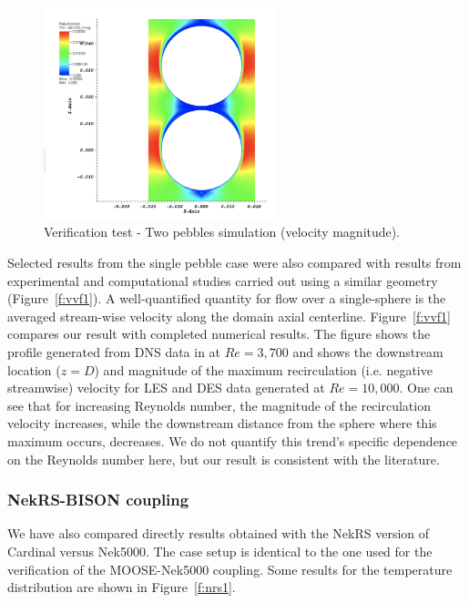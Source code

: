 \begin{figure}[!h]
\centering
\includegraphics[clip=true,width=0.6\textwidth]{Figures/pb_vv2}
\caption{Verification test - Two pebbles simulation (velocity magnitude).}
\label{f:vvf2}
\end{figure}

Selected results from the single pebble case were also compared with results from experimental and computational studies carried out using a similar geometry (Figure~\ref{f:vvf1}). A well-quantified quantity for flow over a single-sphere is the averaged stream-wise velocity along the domain axial centerline. Figure~\ref{f:vvf1} compares our result with completed numerical results. The figure shows the profile generated from DNS data in \cite{fick2017investigation} at $Re = 3,700$ and shows the downstream location ($z=D$) and magnitude of the maximum recirculation (i.e. negative streamwise) velocity for LES and DES data generated at $Re = 10,000$. One can see that for increasing Reynolds number, the magnitude of the recirculation velocity increases, while the downstream distance from the sphere where this maximum occurs, decreases. We do not quantify this trend's specific dependence on the Reynolds number here, but our result is consistent with the literature.

\subsubsection{NekRS-BISON coupling}

We have also compared directly results obtained with the NekRS version of Cardinal versus Nek5000. The case setup is identical to the one used for the verification of the MOOSE-Nek5000 coupling. Some results for the temperature distribution are shown in Figure~\ref{f:nrs1}.

